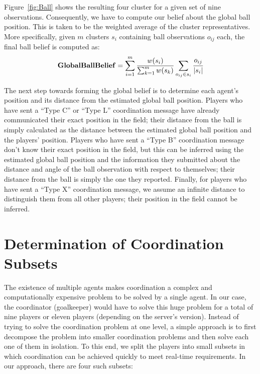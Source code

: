 Figure~\ref{fig:Ball} shows the resulting four cluster for a given set of nine observations.  Consequently, we have to compute our belief about the global ball position. This is taken to be the weighted average of the cluster representatives. More specifically, given $m$ clusters $s_i$ containing ball observations $o_{ij}$ each, the final ball belief is computed as:
\begin{align*}
{\bf Global Ball Belief} = \sum_{i=1}^m \frac {w(s_i)} {\sum_{k=1}^m w(s_k)} \sum_{o_{ij} \in s_i} \cfrac{o_{ij}}{|s_i|}
\end{align*}


The next step towards forming the global belief is to determine each agent's position and its distance from the estimated global ball position. Players who have sent a ``Type C'' or ``Type L'' coordination message have already communicated their exact position in the field; their distance from the ball is simply calculated as the distance between the estimated global ball position and the players' position. Players who have sent a ``Type B'' coordination message don't know their exact position in the field, but this can be inferred using the estimated global ball position and the information they submitted about the distance and angle of the ball observation with respect to themselves; their distance from the ball is simply the one they reported. Finally, for players who have sent a ``Type X'' coordination message, we assume an infinite distance to distinguish them from all other players; their position in the field cannot be inferred. 


\section{Determination of Coordination Subsets}
The existence of multiple agents makes coordination a complex and computationally expensive problem to be solved by a single agent. In our case, the coordinator (goalkeeper) would have to solve this huge problem for a total of nine players or eleven players (depending on the server's version).
Instead of trying to solve the coordination problem at one level, a simple approach is to first decompose the problem into smaller coordination problems and then solve each one of them in isolation. To this end, we split the players into small subsets in which coordination can be achieved quickly to meet real-time requirements. In our approach, there are four such subsets:

